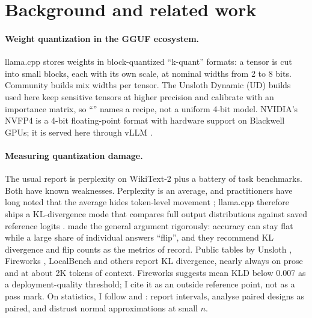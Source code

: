 \section{Background and related work}\label{sec:background}

\paragraph{Weight quantization in the GGUF ecosystem.} llama.cpp \citep{llamacpp} stores weights in
block-quantized ``k-quant'' formats: a tensor is cut into small blocks, each with its own scale, at
nominal widths from 2 to 8 bits. Community builds mix widths per tensor. The Unsloth Dynamic (UD)
builds used here \citep{unsloth_dynamic3,unsloth_qwen38_gguf} keep sensitive tensors at higher
precision and calibrate with an importance matrix, so ``'' names a recipe, not a
uniform 4-bit model. NVIDIA's NVFP4 \citep{nvidia_nvfp4} is a 4-bit floating-point format with
hardware support on Blackwell GPUs; it is served here through vLLM \citep{kwon2023pagedattention,vllm}.

\paragraph{Measuring quantization damage.} The usual report is perplexity on WikiText-2
\citep{merity2017pointer} plus a battery of task benchmarks. Both have known weaknesses. Perplexity is
an average, and practitioners have long noted that the average hides token-level movement
\citep{kalomaze2023ppl}; llama.cpp therefore ships a KL-divergence mode that compares full output
distributions against saved reference logits \citep{llamacpp_perplexity_readme}.
\citet{dutta2024accuracy} made the general argument rigorously: accuracy can stay flat while a large
share of individual answers ``flip'', and they recommend KL divergence and flip counts as the metrics
of record. Public tables by Unsloth \citep{unsloth_dynamic3}, Fireworks
\citep{fireworks2024quantization}, LocalBench \citep{localbench2026gguf} and others
\citep{kurt2026whichquant} report KL divergence, nearly always on prose and at about 2K tokens of
context. Fireworks suggests mean KLD below 0.007 as a deployment-quality threshold; I cite it as an
outside reference point, not as a pass mark. On statistics, I follow \citet{miller2024errorbars} and
\citet{bowyer2025clt}: report intervals, analyse paired designs as paired, and distrust normal
approximations at small $n$.

